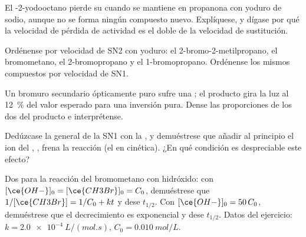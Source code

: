 \begin{exercise}[$\star\star$]\label{exo:b1:nucleophilic-substitution:7}
El -2-yodooctano pierde su  cuando se mantiene en
propanona con yoduro de sodio, aunque no se forma ningún compuesto nuevo.
Explíquese, y dígase por qué la velocidad de pérdida de actividad es el
doble de la velocidad de sustitución.
\end{exercise}

\begin{exercise}[$\star\star$]\label{exo:b1:nucleophilic-substitution:8}
Ordénense por velocidad de SN2 con yoduro: el 2-bromo-2-metilpropano, el
bromometano, el 2-bromopropano y el 1-bromopropano. Ordénense los mismos
compuestos por velocidad de  SN1.
\end{exercise}

\begin{exercise}[$\star\star$]\label{exo:b1:nucleophilic-substitution:9}
Un bromuro secundario ópticamente puro sufre una ; el producto
gira la luz al \qty{12}{\percent} del valor esperado para una inversión
pura. Dense las proporciones de los dos  del producto e
interprétense.
\end{exercise}

\begin{exercise}[$\star\star\star$]\label{exo:b1:nucleophilic-substitution:10}
Dedúzcase la  general de la SN1 con la , y demuéstrese que añadir al principio el ion del
, , frena la reacción (el  en
cinética). ¿En qué condición es despreciable este efecto?
\end{exercise}

\begin{exercise}[$\star\star\star$]\label{exo:b1:nucleophilic-substitution:11}
Dos  para la reacción del bromometano con
hidróxido: con $[\ce{OH-}]_0 = [\ce{CH3Br}]_0 = C_0$, demuéstrese que
$1/[\ce{CH3Br}] = 1/C_0 +
kt$ y dese $t_{1/2}$. Con $[\ce{OH-}]_0 = 50\,C_0$, demuéstrese que el
decrecimiento es exponencial y dese $t_{1/2}$. Datos del ejercicio:
$k =
\qty{2.0e-4}{L/(mol.s)}$, $C_0 = \qty{0.010}{mol/L}$.
\end{exercise}

